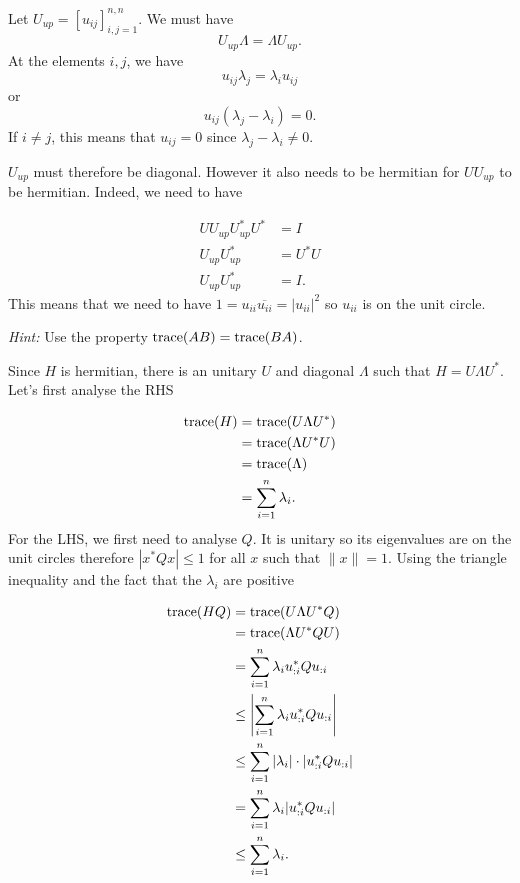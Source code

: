 \begin{solution}
  Let $U_{up} = [u_{ij}]_{i,j=1}^{n,n}$.
  We must have
  \[ U_{up}\Lambda = \Lambda U_{up}. \]
  At the elements $i,j$, we have
  \[ u_{ij} \lambda_j = \lambda_i u_{ij} \]
  or
  \[ u_{ij} (\lambda_j - \lambda_i) = 0. \]
  If $i \neq j$, this means that $u_{ij} = 0$ since $\lambda_j - \lambda_i \neq 0$.

  $U_{up}$ must therefore be diagonal.
  However it also needs to be hermitian for $UU_{up}$ to be hermitian.
  Indeed, we need to have

  \begin{align*}
    UU_{up} U_{up}^*U^* & = I\\
    U_{up} U_{up}^* & = U^*U\\
    U_{up} U_{up}^* & = I.
  \end{align*}
  This means that we need to have $1 = u_{ii}\overline{u_{ii}} = |u_{ii}|^2$
  so $u_{ii}$ is on the unit circle.
\end{solution}

\begin{solution}
  \emph{Hint:}
  Use the property $\operatorname{trace}(AB) = \operatorname{trace}(BA)$.

  Since $H$ is hermitian, there is an unitary $U$ and diagonal $\Lambda$ such that $H = U \Lambda U^*$.
  Let's first analyse the RHS

  \begin{align*}
    \operatorname{trace}(H) & = \operatorname{trace}(U \Lambda U^*)\\
              & = \operatorname{trace}(\Lambda U^*U)\\
              & = \operatorname{trace}(\Lambda)\\
              & = \sum_{i=1}^n \lambda_i.
  \end{align*}
  For the LHS, we first need to analyse $Q$.
  It is unitary so its eigenvalues are on the unit circles therefore $|x^* Q x| \leq 1$ for all $x$ such that $\|x\|=1$.
  Using the triangle inequality and the fact that the $\lambda_i$ are positive

  \begin{align*}
    \operatorname{trace}(HQ)
    & = \operatorname{trace}(U \Lambda U^* Q)\\
    & = \operatorname{trace}(\Lambda U^* Q U)\\
    & = \sum_{i=1}^n \lambda_i u_{:i}^* Q u_{:i}\\
    & \leq \left|\sum_{i=1}^n \lambda_i u_{:i}^* Q u_{:i}\right|\\
    & \leq \sum_{i=1}^n |\lambda_i| \cdot |u_{:i}^* Q u_{:i}|\\
    & = \sum_{i=1}^n \lambda_i |u_{:i}^* Q u_{:i}|\\
    & \leq \sum_{i=1}^n \lambda_i.
  \end{align*}
\end{solution}


